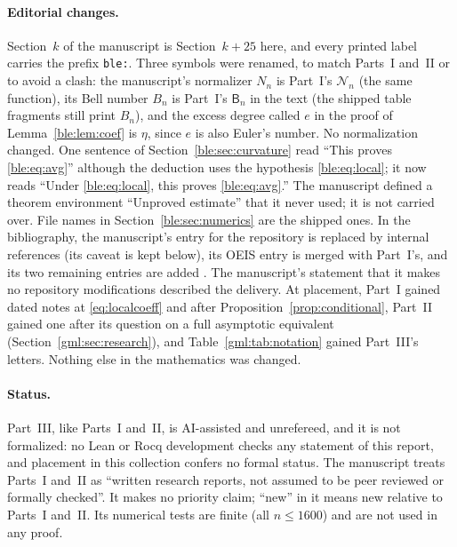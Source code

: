 \documentclass[11pt]{article}
\numberwithin{equation}{section}
\theoremstyle{definition}
\theoremstyle{remark}
\begin{document}
\paragraph{Editorial changes.}
Section~$k$ of the manuscript is Section~$k+25$ here, and every printed
label carries the prefix \texttt{ble:}. Three symbols were renamed, to
match Parts~I and~II or to avoid a clash: the manuscript's normalizer $N_n$
is Part~I's $\mathcal N_n$ (the same function), its Bell number $B_n$ is
Part~I's $\mathsf B_n$ in the text (the shipped table fragments still
print $B_n$), and the excess degree called $e$ in the proof of
Lemma~\ref{ble:lem:coef} is $\eta$, since $e$ is also Euler's number.
No normalization changed. One sentence of
Section~\ref{ble:sec:curvature} read ``This proves \eqref{ble:eq:avg}''
although the deduction uses the hypothesis \eqref{ble:eq:local}; it now
reads ``Under \eqref{ble:eq:local}, this proves \eqref{ble:eq:avg}.''
The manuscript defined a theorem environment ``Unproved estimate'' that
it never used; it is not carried over. File names in
Section~\ref{ble:sec:numerics} are the shipped ones. In the bibliography,
the manuscript's entry for the repository is replaced by internal
references (its caveat is kept below), its OEIS entry is merged with
Part~I's, and its two remaining entries are added
\cite{moserwyman,grunwaldserafin}. The manuscript's statement that it
makes no repository modifications described the delivery. At placement,
Part~I gained dated notes at \eqref{eq:localcoeff} and after
Proposition~\ref{prop:conditional}, Part~II gained one after its question
on a full asymptotic equivalent (Section~\ref{gml:sec:research}), and
Table~\ref{gml:tab:notation} gained Part~III's letters. Nothing else in
the mathematics was changed.

\paragraph{Status.}
Part~III, like Parts~I and~II, is AI-assisted and unrefereed, and it is
not formalized: no Lean or Rocq development checks any statement of this
report, and placement in this collection confers no formal status. The
manuscript treats Parts~I and~II as ``written research reports, not
assumed to be peer reviewed or formally checked''. It makes no priority
claim; ``new'' in it means new relative to Parts~I and~II. Its numerical
tests are finite (all $n\le1600$) and are not used in any proof.
\end{document}
